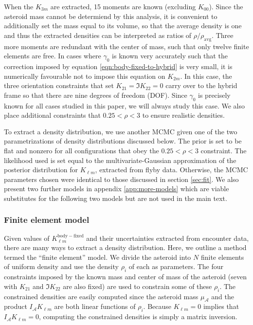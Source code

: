 \documentclass[fleqn,usenatbib]{mnras}
\begin{document}
When the $K_{3m}$ are extracted, 15 moments are known (excluding $K_{00}$). Since the asteroid mass cannot be determiend by this analysis, it is convenient to additionally set the mass equal to its volume, so that the average density is one and thus the extracted densities can be interpreted as ratios of $\rho / \rho_\text{avg}$. Three more moments are redundant with the center of mass, such that only twelve finite elements are free. In cases where $\gamma_0$ is known very accurately such that the correction imposed by equation \ref{eqn:body-fixed-to-hybrid} is very small, it is numerically favourable not to impose this equation on $K_{2m}$. In this case, the three orientation constraints that set $K_{21}=\Im K_{22} = 0$ carry over to the hybrid frame so that there are nine degrees of freedom (DOF). Since $\gamma_0$ is precisely known for all cases studied in this paper, we will always study this case. We also place additional constraints that $0.25 < \rho < 3$ to ensure realistic densities.

To extract a density distribution, we use another MCMC given one of the two parametrizations of density distributions discussed below. The prior is set to be flat and nonzero for all configurations that obey the $0.25 < \rho < 3$ constraint. The likelihood used is set equal to the multivariate-Gaussian approximation of the posterior distribution for $K_{\ell m}$, extracted from flyby data. Otherwise, the MCMC parameters chosen were identical to those discussed in section \ref{sec:fit}. We also present two further models in appendix \ref{app:more-models} which are viable substitutes for the following two models but are not used in the main text.



\subsubsection{Finite element model}

Given values of $K_{\ell m}^\mathrm{body-fixed}$ and their uncertainties extracted from encounter data, there are many ways to extract a density distribution. Here, we outline a method termed the ``finite element'' model. We divide the asteroid into $N$ finite elements of uniform density and use the density $\rho_i$ of each as parameters. The four constraints imposed by the known mass and center of mass of the asteroid (seven with $K_{21}$ and $\Im K_{22}$ are also fixed) are used to constrain some of these $\rho_i$. The constrained densities are easily computed since the asteroid mass $\mu_\mathcal{A}$ and the product $I_\mathcal{A}K_{\ell m}$ are both linear functions of $\rho_i$. Because $K_{\ell m} = 0$ implies that $I_\mathcal{A}K_{\ell m} = 0$, computing the constrained densities is simply a matrix inversion.
\end{document}
